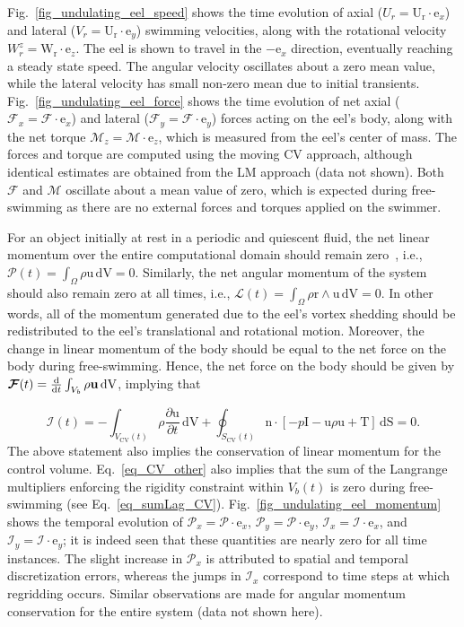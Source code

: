 \documentclass[review]{elsarticle}
\renewcommand \d [2]{\frac{{\rm d} #1}{{\rm d} #2}}
\newcommand \D [2]{\frac{\partial #1}{\partial #2}}
\renewcommand{\vec}[1]{\bm{\mathrm{#1}}}
\newcommand{\V}[1]{\bm{\mathrm{#1}}}
\def \n{\vec{n}}
\def \r{\vec{r}}
\def \u{\vec{u}}
\def \e{\vec{e}}
\def \I{\vec{I}}
\def \T{\vec{T}}
\def \U{\vec{U}}
\def \cM{\vec{\mathcal{M}}}
\def  \Scvt{S_\text{CV}(t)}
\def \Vbt{V_b(t)}
\def \Vb{V_b}
\def  \Vcvt{V_\text{CV}(t)}
\def \cF{\vec{\mathcal{F}}}
\def \I{\vec{I}}
\def \cP{{\mathcal{P}}}
\def \vcP{\vec{\mathcal{P}}}
\def \U{\vec{U}}
\def \Ur{\U_{\text{r}}}
\def \W{\vec{W}}
\def \Wr{\W_{\text{r}}}
\def \cI{\vec{\mathcal{I}}}
\def \vcL{\vec{\mathcal{L}}}
\def \e{\vec{e}}
\def \n{\vec{n}}
\def \u{\vec{u}}
\def \dS{\,\mathrm{dS}}
\def \dV{\,\mathrm{dV}}
\def \ndot{\n \cdot}
\def \rcross{\r \wedge}
\begin{document}
Fig.~\ref{fig_undulating_eel_speed} shows the time evolution of axial ($U_r = \Ur \cdot \e_x$) and lateral
($V_r = \Ur \cdot \e_y$) swimming velocities, along with the rotational velocity $W^z_r = \Wr \cdot \e_z$. The eel
is shown to travel in the $-\e_x$ direction, eventually reaching a steady state speed. The angular velocity
oscillates about a zero mean value, while the lateral velocity has small non-zero mean due to initial transients.
Fig.~\ref{fig_undulating_eel_force} shows the time evolution of net axial ($\mathcal{F}_x = \cF \cdot \e_x$) and lateral
($\mathcal{F}_y = \cF \cdot \e_y$) forces acting on the eel's body, along with the net torque $\mathcal{M}_z = \cM 
\cdot \e_z$, which is measured from the eel's center of mass. The forces and torque are computed using  
the moving CV approach, although identical estimates are obtained from the LM approach (data not shown).
Both $\cF$ and $\cM$ oscillate about a mean value of zero, which is expected during free-swimming as there
are no external forces and torques applied on the swimmer.

For an object initially at rest in a periodic and quiescent fluid, the net linear momentum over 
the entire computational domain should remain zero~\cite{Bhalla13}, i.e., $\vcP(t) = \int_{\Omega} \rho \u \dV = \V0$.
Similarly, the net angular momentum of the system should also remain zero at all times, i.e.,
$\vcL(t) = \int_{\Omega} \rho \rcross \u \dV = \V0$. 
In other words, all of the momentum generated due to the eel's vortex shedding should be
redistributed to the eel's translational and rotational motion. Moreover, the change in linear momentum
of the body should be equal to the net force on the body during free-swimming. Hence, the net force
on the body should be given by $\cF(t) = \d{}{t} \int_{\Vb} \rho \u \dV$, implying that

\begin{equation}
\label{eq_CV_other}
\cI(t) = - \int_{\Vcvt} \rho \D{\u}{t} \dV 
+ \oint_{\Scvt} \ndot \left[-p \I - \u\rho \u + \T \right] \dS = \V0.
\end{equation}
The above statement also implies the conservation of linear momentum for the control volume.
Eq.~\eqref{eq_CV_other} also implies that the sum of the Langrange multipliers enforcing the
rigidity constraint within $\Vbt$ is zero during free-swimming (see Eq.~\eqref{eq_sumLag_CV}).
Fig.~\ref{fig_undulating_eel_momentum} shows the temporal evolution of $\cP_x = \vcP \cdot \e_x$, 
$\cP_y = \vcP \cdot \e_y$, $\mathcal{I}_x = \cI \cdot \e_x$, and $\mathcal{I}_y = \cI \cdot \e_y$; it is indeed seen
that these quantities are nearly zero for all time instances.
The slight increase in $\cP_x$ is attributed to spatial and temporal discretization errors,
whereas the jumps in $\mathcal{I}_x$ correspond to time steps at which regridding occurs.
Similar observations are made for angular momentum conservation for the entire system (data not shown here).
\end{document}
